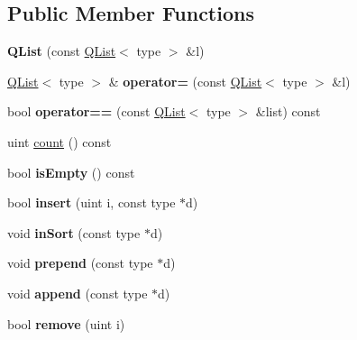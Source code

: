 \subsection*{Public Member Functions}
\begin{DoxyCompactItemize}
\item 
\mbox{\label{class_q_list_ae478762e2cd66b36343b224e145f5511}} 
{\bfseries Q\+List} (const \mbox{\hyperlink{class_q_list}{Q\+List}}$<$ type $>$ \&l)
\item 
\mbox{\label{class_q_list_a89ee1ea9e1b3b67652eb2b261a2e645f}} 
\mbox{\hyperlink{class_q_list}{Q\+List}}$<$ type $>$ \& {\bfseries operator=} (const \mbox{\hyperlink{class_q_list}{Q\+List}}$<$ type $>$ \&l)
\item 
\mbox{\label{class_q_list_a45502137fe242ab9fe8c6dfd860acf96}} 
bool {\bfseries operator==} (const \mbox{\hyperlink{class_q_list}{Q\+List}}$<$ type $>$ \&list) const
\item 
uint \mbox{\hyperlink{class_q_list_a1b95250082189972f4b499a529920180}{count}} () const
\item 
\mbox{\label{class_q_list_a4a86e1c0ab4c7b8fb369e984ea034793}} 
bool {\bfseries is\+Empty} () const
\item 
\mbox{\label{class_q_list_af0672080349b6042d0b7821939c29e42}} 
bool {\bfseries insert} (uint i, const type $\ast$d)
\item 
\mbox{\label{class_q_list_a4cd1b3c27f37804792938ed545d85350}} 
void {\bfseries in\+Sort} (const type $\ast$d)
\item 
\mbox{\label{class_q_list_ad67924b4a5401aaa641e7d0b874c16c6}} 
void {\bfseries prepend} (const type $\ast$d)
\item 
\mbox{\label{class_q_list_a135a23ed5f79ddc9b7d071545032f1a5}} 
void {\bfseries append} (const type $\ast$d)
\item 
\mbox{\label{class_q_list_a2b10cb9f341824ad2791cdbcd7e77920}} 
bool {\bfseries remove} (uint i)
\item 
\mbox{\label{class_q_list_a97c1188c51f5628f3c8aec209aec6152}} 

\end{DoxyCompactItemize}
